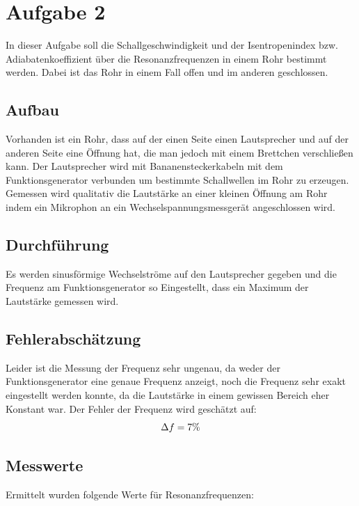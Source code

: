 \newpage
\section{Aufgabe 2}
In dieser Aufgabe soll die Schallgeschwindigkeit und der Isentropenindex bzw. Adiabatenkoeffizient über die Resonanzfrequenzen in einem Rohr bestimmt werden. Dabei ist das Rohr in einem Fall offen und im anderen geschlossen.
\subsection{Aufbau}
Vorhanden ist ein Rohr, dass auf der einen Seite einen Lautsprecher und auf der anderen Seite eine Öffnung hat, die man jedoch mit einem Brettchen verschließen kann. Der Lautsprecher wird mit Bananensteckerkabeln mit dem Funktionsgenerator verbunden um bestimmte Schallwellen im Rohr zu erzeugen. Gemessen wird qualitativ die Lautstärke an einer kleinen Öffnung am Rohr indem ein Mikrophon an ein Wechselspannungsmessgerät angeschlossen wird.
\subsection{Durchführung}
Es werden sinusförmige Wechselströme auf den Lautsprecher gegeben und die Frequenz am Funktionsgenerator so Eingestellt, dass ein Maximum der Lautstärke gemessen wird.
\subsection{Fehlerabschätzung}
Leider ist die Messung der Frequenz sehr ungenau, da weder der Funktionsgenerator eine genaue Frequenz anzeigt, noch die Frequenz sehr exakt eingestellt werden konnte, da die Lautstärke in einem gewissen Bereich eher Konstant war. Der Fehler der Frequenz wird geschätzt auf:
\begin{equation}
\Delta f = 7\% \notag
\end{equation}
\newpage
\subsection{Messwerte}
Ermittelt wurden folgende Werte für Resonanzfrequenzen:


